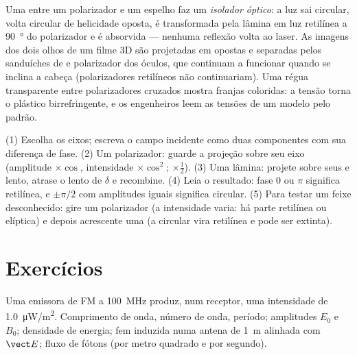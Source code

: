 \begin{example}\label{ex:b2:plane-waves-polarization:plateuses}
Uma  entre um polarizador e um espelho faz um
\emph{isolador óptico}: a luz sai circular, volta
circular de helicidade oposta, é transformada pela lâmina em luz retilínea
a \qty{90}{\degree} do polarizador e é absorvida --- nenhuma
reflexão volta ao laser. As imagens dos dois olhos de um filme 3D são
projetadas em  opostas e separadas pelos
sanduíches de  e polarizador dos óculos, que continuam a funcionar
quando se inclina a cabeça (polarizadores retilíneos não continuariam). Uma régua
transparente entre polarizadores cruzados mostra franjas coloridas: a tensão torna
o plástico birrefringente, e os engenheiros leem as tensões de um modelo pelo
padrão.
\end{example}

\begin{method}\label{met:b2:plane-waves-polarization:method}
(1) Escolha os eixos; escreva o campo incidente como duas componentes com
sua diferença de fase. (2) Um polarizador: guarde a projeção sobre seu
eixo (amplitude $\times\cos$, intensidade $\times\cos^2$; 
$\times\tfrac12$). (3) Uma lâmina: projete sobre seus  e lento, atrase
o lento de $\delta$ e recombine. (4) Leia o resultado: fase $0$ ou $\pi$
significa retilínea, e $\pm\pi/2$ com amplitudes iguais significa circular. (5) Para
testar um feixe desconhecido: gire um polarizador (a intensidade varia: há parte
retilínea ou elíptica) e depois acrescente uma  (a circular vira
retilínea e pode ser extinta).
\end{method}

\section{Exercícios}

\begin{exercise}[$\star$]\label{exo:b2:plane-waves-polarization:1}
Uma emissora de FM a \qty{100}{MHz} produz, num receptor, uma intensidade de
\qty{1.0}{\micro W/m^2}. Comprimento de onda, número de onda, período; amplitudes $E_0$ e
$B_0$; densidade de energia; fem induzida numa antena de \qty{1}{m} alinhada com
$\vect E$; fluxo de fótons (por metro quadrado e por segundo).
\end{exercise}

